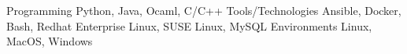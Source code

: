 

\begin{cvskills}


 \cvskill 
     {Programming} %
     {Python, Java, Ocaml, C/C++} %
 \cvskill
     {Tools/Technologies} %
     {Ansible, Docker, Bash, Redhat Enterprise Linux, SUSE Linux, MySQL}
 \cvskill
     {Environments}  %
     {Linux, MacOS, Windows} %
    

\end{cvskills}
